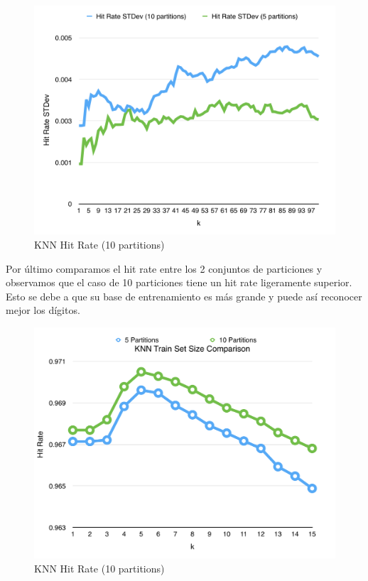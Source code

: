 \begin{figure}[h!]
  \begin{center}
	\includegraphics[scale=0.7]{exp1/KNN-Hit-Rate-stdev.png}
	\caption{KNN Hit Rate (10 partitions)}
  \end{center}
\end{figure}

Por último comparamos el hit rate entre los 2 conjuntos de particiones y observamos que el caso de 10 particiones tiene un hit rate ligeramente superior. Esto se debe a que su base de entrenamiento es más grande y puede así reconocer mejor los dígitos.\\

\begin{figure}[h!]
  \begin{center}
	\includegraphics[scale=0.6]{exp1/KNN-Train-Set-Size.png}
	\caption{KNN Hit Rate (10 partitions)}
  \end{center}
\end{figure}



